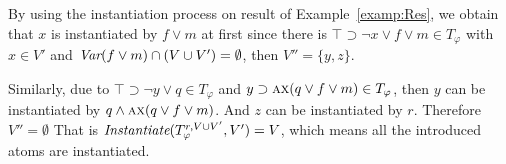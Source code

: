 \documentclass[letterpaper]{article} %
\begin{document}
\begin{example}\label{exa:until:sub}
By using the instantiation process on result of Example~\ref{examp:Res}, we obtain that $x$ is instantiated by $f\vee m$ at first since there is $\top \supset \neg x \vee f \vee m \in T_{\varphi}$ with $x \in V'$ and $\textit{Var}(f \vee m) \cap (V\cup V') = \emptyset$, then $V''=\{y,z\}$.

Similarly, due to $\top \supset \neg y \vee q \in T_{\varphi}$ and $y \supset \textsc{a}\textsc{x}(q \vee f\vee m)\in T_{\varphi}$, then $y$ can be instantiated by $q \wedge \textsc{a}\textsc{x}(q \vee f\vee m)$. And $z$ can be instantiated by $r$. Therefore $V''=\emptyset$
That is $\emph{Instantiate}(T_{\varphi}^{r,V \cup V'}, V') = V$, which means all the introduced atoms are instantiated.
%
%

\end{example}
\end{document}
